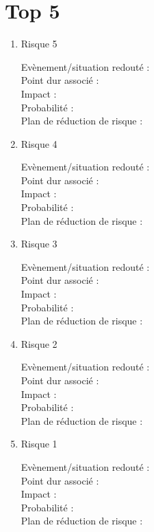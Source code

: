 \documentclass{report}
\begin{document}
\section*{Top 5}
\begin{enumerate}
\item Risque 5
\begin{description}
\item [Evènement/situation redouté :]
\item [Point dur associé :]
\item [Impact :]
\item [Probabilité :]
\item [Plan de réduction de risque :]
\end{description}
\item Risque 4
\begin{description}
\item [Evènement/situation redouté :]
\item [Point dur associé :]
\item [Impact :]
\item [Probabilité :]
\item [Plan de réduction de risque :]
\end{description}
\item Risque 3
\begin{description}
\item [Evènement/situation redouté :]
\item [Point dur associé :]
\item [Impact :]
\item [Probabilité :]
\item [Plan de réduction de risque :]
\end{description}
\item Risque 2
\begin{description}
\item [Evènement/situation redouté :]
\item [Point dur associé :]
\item [Impact :]
\item [Probabilité :]
\item [Plan de réduction de risque :]
\end{description}
\item Risque 1
\begin{description}
\item [Evènement/situation redouté :]
\item [Point dur associé :]
\item [Impact :]
\item [Probabilité :]
\item [Plan de réduction de risque :]
\end{description}
\end{enumerate}
\end{document}
